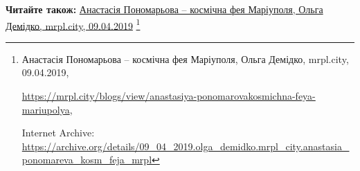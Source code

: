  
 
 
 
 

\def\pubIA{https://archive.org/details/09_04_2019.olga_demidko.mrpl_city.anastasia_ponomareva_kosm_feja_mrpl}
\def\pubTitle{Анастасія Пономарьова – космічна фея Маріуполя}
\def\pubDate{09.04.2019}
\def\pubOrigin{https://mrpl.city/blogs/view/anastasiya-ponomarovakosmichna-feya-mariupolya}
\def\pubAuthor{Ольга Демідко}

\textbf{Читайте також:} \href{\pubIA}{%
\pubTitle, \pubAuthor, mrpl.city, \pubDate}%
\footnote{\pubTitle, \pubAuthor, mrpl.city, \pubDate, \par\url{\pubOrigin}, \par Internet Archive: \url{\pubIA}}
